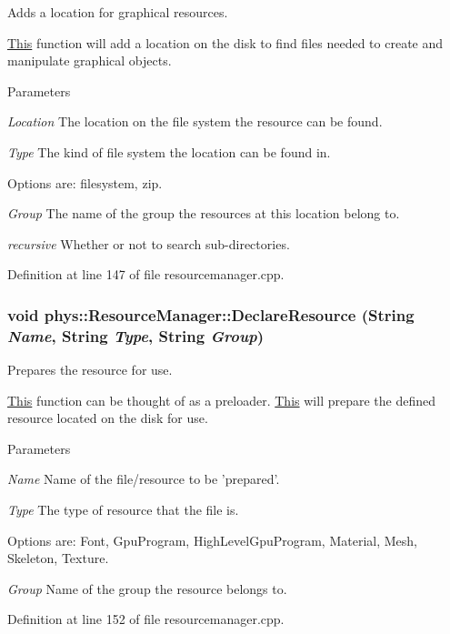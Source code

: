 Adds a location for graphical resources. 

\hyperlink{structThis}{This} function will add a location on the disk to find files needed to create and manipulate graphical objects. 
\begin{DoxyParams}{Parameters}
\item[{\em Location}]The location on the file system the resource can be found. \item[{\em Type}]The kind of file system the location can be found in. \par
 Options are: filesystem, zip. \item[{\em Group}]The name of the group the resources at this location belong to. \item[{\em recursive}]Whether or not to search sub-\/directories. \end{DoxyParams}


Definition at line 147 of file resourcemanager.cpp.

\hypertarget{classphys_1_1ResourceManager_abdb95affe5556ff2ff9aa312e740e584}{
\subsubsection[{DeclareResource}]{\setlength{\rightskip}{0pt plus 5cm}void phys::ResourceManager::DeclareResource ({\bf String} {\em Name}, \/  {\bf String} {\em Type}, \/  {\bf String} {\em Group})}}
\label{d1/d35/classphys_1_1ResourceManager_abdb95affe5556ff2ff9aa312e740e584}


Prepares the resource for use. 

\hyperlink{structThis}{This} function can be thought of as a preloader. \hyperlink{structThis}{This} will prepare the defined resource located on the disk for use. 
\begin{DoxyParams}{Parameters}
\item[{\em Name}]Name of the file/resource to be 'prepared'. \item[{\em Type}]The type of resource that the file is. \par
 Options are: Font, GpuProgram, HighLevelGpuProgram, Material, Mesh, Skeleton, Texture. \item[{\em Group}]Name of the group the resource belongs to. \end{DoxyParams}


Definition at line 152 of file resourcemanager.cpp.

